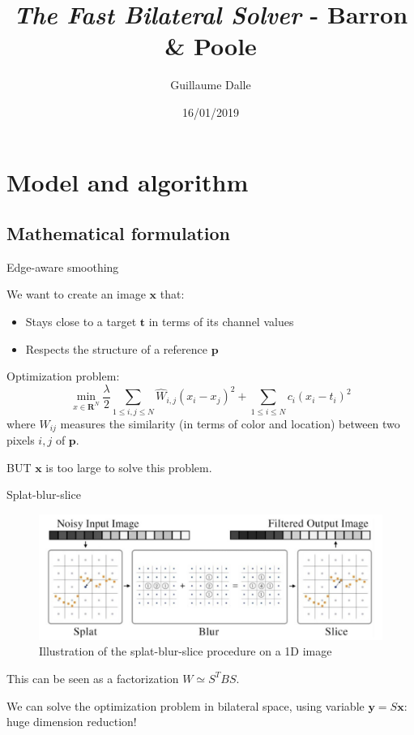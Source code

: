 \documentclass{beamer}
\title[The Fast Bilateral Solver]{\textit{The Fast Bilateral Solver}
- Barron \& Poole}
\author{Guillaume Dalle}
\institute{MVA - Imagerie numérique}
\date{16/01/2019}
\begin{document}
\begin{frame}
\titlepage
\end{frame}

\section{Model and algorithm}

\subsection{Mathematical formulation}

\begin{frame}{Edge-aware smoothing}

We want to create an image $\textbf{x}$ that:
\begin{itemize}
    \item Stays close to a target $\textbf{t}$ in terms of its channel values
    \item Respects the structure of a reference $\textbf{p}$
\end{itemize}

\pause
Optimization problem:
$$\min_{x \in \textbf{R}^N} \frac{\lambda}{2} \sum_{1 \leq i, j \leq N}{\hat{W}_{i, j} (x_i - x_j)^2} + \sum_{1 \leq i \leq N}{c_i (x_i - t_i)^2}$$
where $W_{ij}$ measures the similarity (in terms of color and location) between two pixels $i,j$ of $\textbf{p}$.

\pause
BUT $\textbf{x}$ is too large to solve this problem.
\end{frame}

\begin{frame}{Splat-blur-slice}
\begin{figure}
\centering
\includegraphics[width=\linewidth]{pictures/SBS.png}
\caption{Illustration of the splat-blur-slice procedure on a 1D image}
\end{figure}

\pause
This can be seen as a factorization $W \simeq S^T B S$.

We can solve the optimization problem in bilateral space, using variable $\textbf{y} = S \textbf{x}$: huge dimension reduction!
\end{frame}
\end{document}
